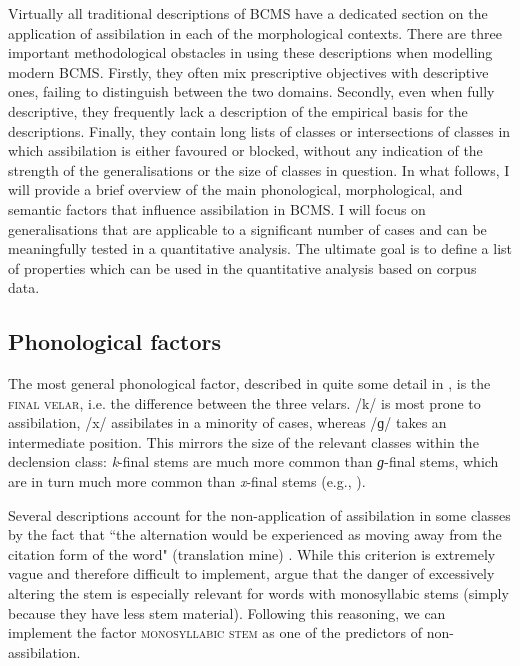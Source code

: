 \documentclass[output=paper,colorlinks,citecolor=brown]{langscibook}
\begin{document}
Virtually all traditional descriptions of BCMS have a dedicated section on the application of assibilation in each of the morphological contexts. There are three important methodological obstacles in using these descriptions when modelling modern BCMS.  Firstly, they often mix prescriptive objectives with descriptive ones, failing to distinguish between the two domains. Secondly, even when fully descriptive, they frequently lack a description of the empirical basis for the descriptions. Finally, they contain long lists of classes or intersections of classes in which assibilation is either favoured or blocked, without any indication of the strength of the generalisations or the size of classes in question. 
In what follows, I will provide a brief overview of the main phonological, morphological, and semantic factors that influence assibilation in BCMS. I will focus on generalisations that are applicable to a significant number of cases and can be meaningfully tested in a quantitative analysis. The ultimate goal is to define a list of properties which can be used in the quantitative analysis based on corpus data.

\subsection{Phonological factors}
\label{subsec:phonological}

The most general phonological factor, described in quite some detail in \citet{tezak1986sibilarizacija}, is the \textsc{final velar}, i.e. the difference between the three velars. /k/ is most prone to assibilation, /x/ assibilates in a minority of cases, whereas /ɡ/ takes an intermediate position. This mirrors the size of the relevant classes within the declension class: \textit{k}-final stems are much more common than \textit{ɡ}-final stems, which are in turn much more common than \textit{x}-final stems (e.g., \cite[475--478]{guduric2010fonologija}).

Several descriptions account for the non-application of assibilation in some classes by the fact that ``the alternation would be experienced as moving away from the citation form of the word" (translation mine) \citep[47]{pevsikan2010pravopis}. While this criterion is extremely vague and therefore difficult to implement, \citet[154]{Bar1995} argue that the danger of excessively altering the stem is especially relevant for words with monosyllabic stems (simply because they have less stem material). Following this reasoning, we can implement the factor \textsc{monosyllabic stem} as one of the predictors of non-assibilation. 
\end{document}
